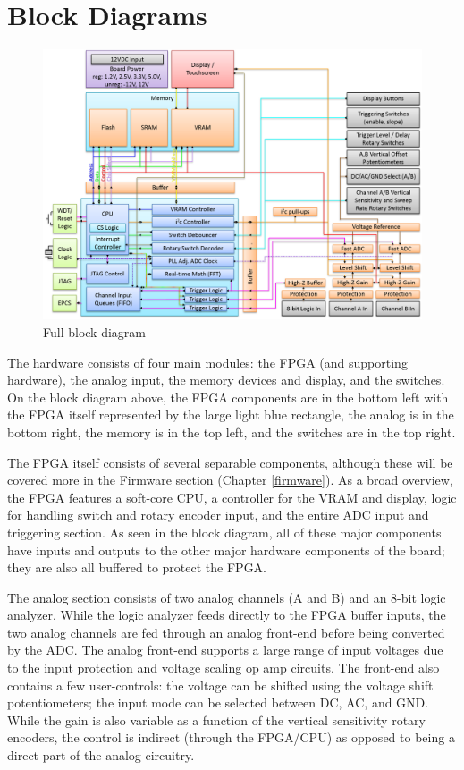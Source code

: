 \section{Block Diagrams} %

\begin{figure}[ht!]
    \centering
    \includegraphics[width=6in]{block_diagrams/full.png}
		\caption{Full block diagram}
\end{figure}

The hardware consists of four main modules: the FPGA (and supporting hardware), the analog input, the memory devices and display, and the switches. On the block diagram above, the FPGA components are in the bottom left with the FPGA itself represented by the large light blue rectangle, the analog is in the bottom right, the memory is in the top left, and the switches are in the top right.

The FPGA itself consists of several separable components, although these will be covered more in the Firmware section (Chapter \ref{firmware}). As a broad overview, the FPGA features a soft-core CPU, a controller for the VRAM and display, logic for handling switch and rotary encoder input, and the entire ADC input and triggering section. As seen in the block diagram, all of these major components have inputs and outputs to the other major hardware components of the board; they are also all buffered to protect the FPGA.

The analog section consists of two analog channels (A and B) and an 8-bit logic analyzer. While the logic analyzer feeds directly to the FPGA buffer inputs, the two analog channels are fed through an analog front-end before being converted by the ADC. The analog front-end supports a large range of input voltages due to the input protection and voltage scaling op amp circuits. The front-end also contains a few user-controls: the voltage can be shifted using the voltage shift potentiometers; the input mode can be selected between DC, AC, and GND. While the gain is also variable as a function of the vertical sensitivity rotary encoders, the control is indirect (through the FPGA/CPU) as opposed to being a direct part of the analog circuitry.

